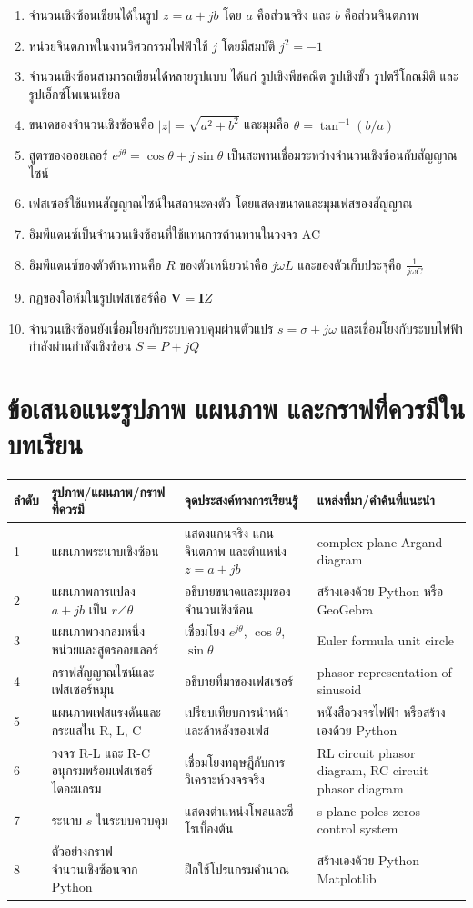 \begin{enumerate}
\item จำนวนเชิงซ้อนเขียนได้ในรูป $z=a+jb$ โดย $a$ คือส่วนจริง และ $b$ คือส่วนจินตภาพ
\item หน่วยจินตภาพในงานวิศวกรรมไฟฟ้าใช้ $j$ โดยมีสมบัติ $j^2=-1$
\item จำนวนเชิงซ้อนสามารถเขียนได้หลายรูปแบบ ได้แก่ รูปเชิงพีชคณิต รูปเชิงขั้ว รูปตรีโกณมิติ และรูปเอ็กซ์โพเนนเชียล
\item ขนาดของจำนวนเชิงซ้อนคือ $|z|=\sqrt{a^2+b^2}$ และมุมคือ $\theta=\tan^{-1}(b/a)$
\item สูตรของออยเลอร์ $e^{j\theta}=\cos\theta+j\sin\theta$ เป็นสะพานเชื่อมระหว่างจำนวนเชิงซ้อนกับสัญญาณไซน์
\item เฟสเซอร์ใช้แทนสัญญาณไซน์ในสถานะคงตัว โดยแสดงขนาดและมุมเฟสของสัญญาณ
\item อิมพีแดนซ์เป็นจำนวนเชิงซ้อนที่ใช้แทนการต้านทานในวงจร AC
\item อิมพีแดนซ์ของตัวต้านทานคือ $R$ ของตัวเหนี่ยวนำคือ $j\omega L$ และของตัวเก็บประจุคือ $\frac{1}{j\omega C}$
\item กฎของโอห์มในรูปเฟสเซอร์คือ $\mathbf{V}=\mathbf{I}Z$
\item จำนวนเชิงซ้อนยังเชื่อมโยงกับระบบควบคุมผ่านตัวแปร $s=\sigma+j\omega$ และเชื่อมโยงกับระบบไฟฟ้ากำลังผ่านกำลังเชิงซ้อน $S=P+jQ$
\end{enumerate}

\section{ข้อเสนอแนะรูปภาพ แผนภาพ และกราฟที่ควรมีในบทเรียน}

\begin{longtable}{L{0.08\textwidth}L{0.28\textwidth}L{0.29\textwidth}L{0.20\textwidth}}
\toprule
\textbf{ลำดับ} & \textbf{รูปภาพ/แผนภาพ/กราฟที่ควรมี} & \textbf{จุดประสงค์ทางการเรียนรู้} & \textbf{แหล่งที่มา/คำค้นที่แนะนำ} \\
 & แผนภาพระนาบเชิงซ้อน & แสดงแกนจริง แกนจินตภาพ และตำแหน่ง $z=a+jb$ & complex plane Argand diagram \\
2 & แผนภาพการแปลง $a+jb$ เป็น $r\angle\theta$ & อธิบายขนาดและมุมของจำนวนเชิงซ้อน & สร้างเองด้วย Python หรือ GeoGebra \\
3 & แผนภาพวงกลมหนึ่งหน่วยและสูตรออยเลอร์ & เชื่อมโยง $e^{j\theta}$, $\cos\theta$, $\sin\theta$ & Euler formula unit circle \\
4 & กราฟสัญญาณไซน์และเฟสเซอร์หมุน & อธิบายที่มาของเฟสเซอร์ & phasor representation of sinusoid \\
5 & แผนภาพเฟสแรงดันและกระแสใน R, L, C & เปรียบเทียบการนำหน้าและล้าหลังของเฟส & หนังสือวงจรไฟฟ้า หรือสร้างเองด้วย Python \\
6 & วงจร R-L และ R-C อนุกรมพร้อมเฟสเซอร์ไดอะแกรม & เชื่อมโยงทฤษฎีกับการวิเคราะห์วงจรจริง & RL circuit phasor diagram, RC circuit phasor diagram \\
7 & ระนาบ $s$ ในระบบควบคุม & แสดงตำแหน่งโพลและซีโรเบื้องต้น & s-plane poles zeros control system \\
8 & ตัวอย่างกราฟจำนวนเชิงซ้อนจาก Python & ฝึกใช้โปรแกรมคำนวณ & สร้างเองด้วย Python Matplotlib \\
\bottomrule
\end{longtable}

